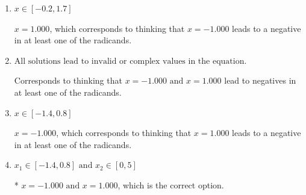 \documentclass{extbook}[14pt]
\begin{document}
\begin{enumerate}
{\begin{enumerate}[label=\Alph*.]
$x = 1.000 \text{ and } x = 1.000$, which are the negative or absolute values of the values you would have gotten by solving the equation correctly.
\item \( x \in [-0.2,1.7] \)

$x = 1.000$, which corresponds to thinking that $x = -1.000$ leads to a negative in at least one of the radicands.
\item \( \text{All solutions lead to invalid or complex values in the equation.} \)

Corresponds to thinking that $x = -1.000 \text{ and } x = 1.000$ lead to negatives in at least one of the radicands.
\item \( x \in [-1.4,0.8] \)

$x = -1.000$, which corresponds to thinking that $x = 1.000$ leads to a negative in at least one of the radicands.
\item \( x_1 \in [-1.4, 0.8] \text{ and } x_2 \in [0,5] \)

* $x = -1.000 \text{ and } x = 1.000$, which is the correct option.
\end{enumerate}

}
\end{enumerate}
\end{document}
